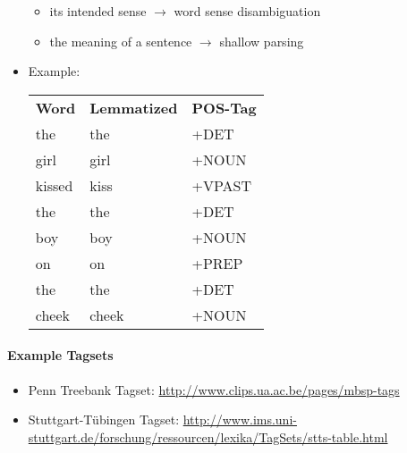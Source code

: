 \documentclass[a4paper, 11pt, accentcolor = tud3b]{tudreport}
\providecommand{\HREF}[1]{\href{#1}{#1}}
\begin{document}
\begin{itemize}
\begin{itemize}
                    			\item its intended sense \( \rightarrow \) word sense disambiguation
                    			\item the meaning of a sentence \( \rightarrow \) shallow parsing
                    		\end{itemize}
                    	\item Example:
                    		\begin{table}[H]
                    			\centering
                    			\begin{tabular}{l l l}
                    				\textbf{Word} & \textbf{Lemmatized} & \textbf{POS-Tag} \\
                    				the           & the                 & +DET             \\
                    				girl          & girl                & +NOUN            \\
                    				kissed        & kiss                & +VPAST           \\
                    				the           & the                 & +DET             \\
                    				boy           & boy                 & +NOUN            \\
                    				on            & on                  & +PREP            \\
                    				the           & the                 & +DET             \\
                    				cheek         & cheek               & +NOUN
                    			\end{tabular}
                    		\end{table}
                    \end{itemize}

					\paragraph{Example Tagsets} %
						\begin{itemize}
							\item Penn Treebank Tagset: \HREF{http://www.clips.ua.ac.be/pages/mbsp-tags}
							\item Stuttgart-Tübingen Tagset: \HREF{http://www.ims.uni-stuttgart.de/forschung/ressourcen/lexika/TagSets/stts-table.html}
						\end{itemize}
\end{document}
